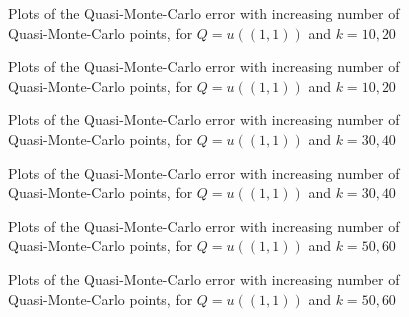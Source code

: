 \begin{figure}[h]
    \centering
    
    \caption{Plots of the Quasi-Monte-Carlo error with increasing number of Quasi-Monte-Carlo points, for $Q=u((1,1))$ and $k=10,20$ \label{fig:qmctop_right10}}
  \end{figure}
\begin{figure}[h]
  \centering

\caption{Plots of the Quasi-Monte-Carlo error with increasing number of Quasi-Monte-Carlo points, for $Q=u((1,1))$ and $k=10,20$ \label{fig:qmctop_right20}}
\end{figure}
\begin{figure}[h]
    \centering
    
    \caption{Plots of the Quasi-Monte-Carlo error with increasing number of Quasi-Monte-Carlo points, for $Q=u((1,1))$ and $k=30,40$ \label{fig:qmctop_right30}}
  \end{figure}
\begin{figure}[h]
  \centering

\caption{Plots of the Quasi-Monte-Carlo error with increasing number of Quasi-Monte-Carlo points, for $Q=u((1,1))$ and $k=30,40$ \label{fig:qmctop_right40}}
\end{figure}
\begin{figure}[h]
    \centering
    
    \caption{Plots of the Quasi-Monte-Carlo error with increasing number of Quasi-Monte-Carlo points, for $Q=u((1,1))$ and $k=50,60$ \label{fig:qmctop_right50}}
  \end{figure}
\begin{figure}[h]
  \centering

\caption{Plots of the Quasi-Monte-Carlo error with increasing number of Quasi-Monte-Carlo points, for $Q=u((1,1))$ and $k=50,60$ \label{fig:qmctop_right60}}
\end{figure}

